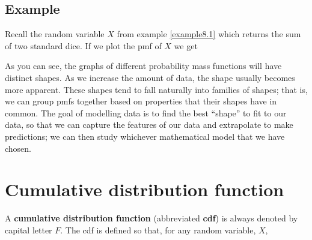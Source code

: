 \subsection{Example} \label{example8.12}
Recall the random variable $X$ from example \ref{example8.1} which returns the sum of two standard dice. If we plot the pmf of $X$ we get
\begin{center}
\end{center}
As you can see, the graphs of different probability mass functions will have distinct shapes. As we increase the amount of data, the shape usually becomes more apparent. These shapes tend to fall naturally into families of shapes; that is, we can group pmfs together based on properties that their shapes have in common. The goal of modelling data is to find the best ``shape'' to fit to our data, so that we can capture the features of our data and extrapolate to make predictions; we can then study whichever mathematical model that we have chosen. 

\section{Cumulative distribution function} \label{cdf}
A \textbf{cumulative distribution function} (abbreviated \textbf{cdf}) is always denoted by capital letter $F.$ The cdf is defined so that, for any random variable, $X$, \label{symbF(x)}

  	\bigskip
	
	\hfil{}
	\bigskip
	\bigskip

